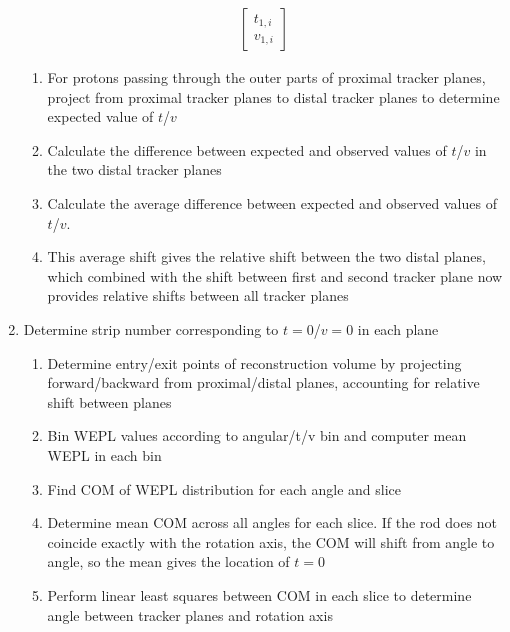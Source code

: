 \documentclass{article}
\begin{document}
\begin{enumerate}
\begin{align*}
\begin{bmatrix}
            t_{1,i}\\
            v_{1,i}
        \end{bmatrix}
    \end{align*}
    \begin{enumerate}
        \item For protons passing through the outer parts of proximal tracker planes, project from proximal tracker planes to distal tracker planes to determine expected value of $t$/$v$
        \item Calculate the difference between expected and observed values of $t$/$v$ in the two distal tracker planes
        \item Calculate the average difference between expected and observed values of $t$/$v$.
        \item This average shift gives the relative shift between the two distal planes, which combined with the shift between first and second tracker plane now provides relative shifts between all tracker planes
    \end{enumerate}
    \item Determine strip number corresponding to $t = 0$/$v = 0$ in each plane
    \begin{enumerate}
        \item Determine entry/exit points of reconstruction volume by projecting forward/backward from proximal/distal planes, accounting for relative shift between planes
        \item Bin WEPL values according to angular/t/v bin and computer mean WEPL in each bin
        \item Find COM of WEPL distribution for each angle and slice
        \item Determine mean COM across all angles for each slice.  If the rod does not coincide exactly with the rotation axis, the COM will shift from angle to angle, so the mean gives the location of $t = 0$
        \item Perform linear least squares between COM in each slice to determine angle between tracker planes and rotation axis
    \end{enumerate}
\end{enumerate}
\end{document}
